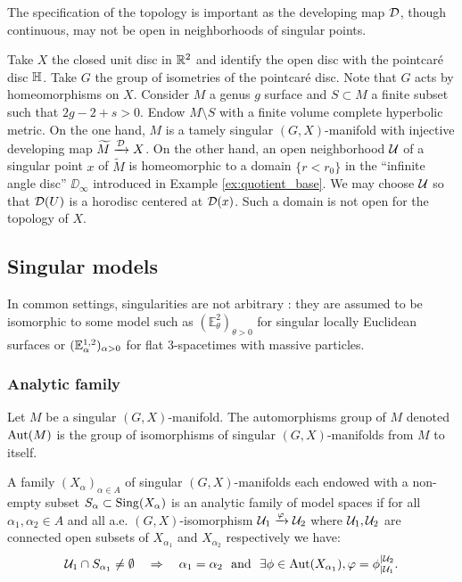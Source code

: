  The specification of the topology is important as the developing map $\mathcal{D}$, though continuous, may not be open in neighborhoods of singular points.
 \begin{ex}
  Take $X$ the closed unit disc in $\mathbb R^2$ and identify the open disc with the pointcaré disc $\mathbb{H}$. Take $G$ the group of isometries of the pointcaré disc. Note that $G$ acts by homeomorphisms on $X$.
  Consider $M$ a genus $g$ surface and $S\subset M$ a finite subset such that $2g-2+s>0$. Endow $M\setminus S$ with a finite volume complete hyperbolic metric. 
  On the one hand, $M$ is a tamely singular $(G,X)$-manifold with injective developing map $\widetilde M \xrightarrow{\mathcal{D}} X$. On the other hand, an open neighborhood $\mathcal{U}$ of a singular point $x$ of $\widetilde M$ is homeomorphic to a domain $\{r<r_0\}$ in the  ``infinite angle disc'' $\DD_\infty$ introduced in Example \ref{ex:quotient_base}. We may choose $\mathcal{U}$ so that $\mathcal{D}(U)$ is a horodisc centered at $\mathcal{D}(x)$. Such a domain is not open for the topology of $X$.
  
  
 \end{ex}





\subsection{Singular models}

In common settings, singularities are not arbitrary : they are assumed to be isomorphic to some model such as $(\mathbb E^2_{\theta})_{\theta>0}$ for singular locally Euclidean surfaces or $(\mathbb{E}^{1,2}_\alpha)_{\alpha>0}$ for flat 3-spacetimes with massive particles.

\subsubsection{Analytic family}

\begin{defi}
 Let $M$ be a singular $(G,X)$-manifold. The automorphisms group of $M$ denoted $\mathrm{Aut}(M)$ is the group of isomorphisms of singular $(G,X)$-manifolds from $M$ to itself.
\end{defi}

\begin{defi} A family $(X_\alpha)_{\alpha \in A}$ of singular $(G,X)$-manifolds each endowed with a non-empty subset $S_\alpha\subset \mathrm{Sing}(X_\alpha)$ is an analytic family of model spaces if for all $\alpha_1,\alpha_2\in A$ and all a.e. $(G,X)$-isomorphism $\mathcal{U}_1\xrightarrow{\varphi} \mathcal{U}_2$ where $\mathcal{U}_1,\mathcal{U}_2$ are connected open subsets of $X_{\alpha_1}$ and $X_{\alpha_2}$ respectively we have:
$$\mathcal{U}_1\cap S_{\alpha_1}\neq \emptyset \quad \Rightarrow \quad \alpha_1=\alpha_2 ~~\text{and}~~\exists \phi \in  \mathrm{Aut}(X_{\alpha_1}), \varphi=\phi_{|\mathcal{U}_1}^{|\mathcal{U}_2}.$$


\end{defi}

